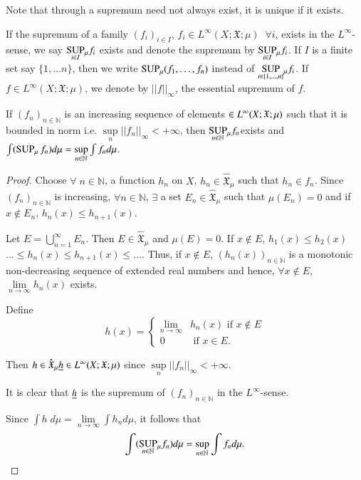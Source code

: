 Note that through a supremum need not always exist, it is unique if it
exists. 

If the supremum of a family $(f_i)_{i\in I}$, $f_i \in L^\infty (X;
\mathfrak{X}; \mu) \;\; \forall i$, exists in the $L^\infty$-sense, we say
$\underset{i \in I}{\operatorname{SUP}}{}_\mu f_i$ exists and denote the supremum by
$\underset{i\in I } {\operatorname{SUP}}{}_\mu f_i$. If $I$ is a finite set say
$\{1, \ldots n\}$, then we write $\operatorname{SUP}_\mu (f_1, \ldots ,f_n)$ instead
of $\underset{i\in \{1, \ldots, n\}}{\operatorname{SUP}}{}_\mu f_i$. If $f\in
L^\infty(X; \mathfrak{X}; \mu)$, we denote by $||f||_\infty$, the
essential supremum of $f$. 

\begin{proposition}\label{part1:chap3:prop26}
If $(f_n)_{n \in \mathbb{N}}$ is an increasing sequence of elements
$\in\break L^\infty(X; \mathfrak{X}; \mu)$ such that it is bounded in norm
i.e. $\sup\limits_n ||f_n||_\infty < + \infty$, then $\underset{n \in
  \mathbb{N}}{\operatorname{SUP}}{}_\mu f_n $\pageoriginale exists and $\int
(\operatorname{SUP}_\mu f_n) d\mu = \sup\limits_{n \in\mathbb{N}} \int f_n d \mu$. 
\end{proposition}


\begin{proof}
Choose $\forall \; n \in \mathbb{N}$, a function $h_n$ on $X$, $h_n
\in\hat{\mathfrak{X}}_\mu$ such that $h_n \in f_n$. Since $(f_n)_{n
  \in \mathbb{N}}$ is increasing, $\forall n \in \mathbb{N}$,
$\exists$ a set $E_n \in\hat{\mathfrak{X}}_\mu$ such that $\mu(E_n) =
0$ and if $x \not\in E_n$, $h_n(x) \leq h_{n+1} (x)$. 

Let $E = \bigcup\limits^\infty_{n =1} E_n$. Then $E \in
\hat{\mathfrak{X}}_\mu$ and $\mu(E) = 0$. If $x \not\in E$, $h_1 (x)
\leq h_2 (x)$ $\ldots \leq h_n (x) \leq h_{n+1} (x) \leq
\ldots$. Thus, if $x \not\in E$, $(h_n (x))_{n \in\mathbb{N}}$ is a
monotonic non-decreasing sequence of extended real numbers and hence,
$\forall x \not\in E$, $\lim\limits_{n \to \infty} h_n (x)$  exists. 

Define 
$$
h(x) = \begin{cases}
\lim\limits_{n \to \infty} &  h_n (x) \text{ if } x \not\in E\\
0 & \text{ if } x \in E. 
\end{cases}
$$

Then $h \in \hat{\mathfrak{X}}_\mu \underline{h} \in  L^\infty(X; \mathfrak{X};
\mu)$ since $\sup\limits_n ||f_n||_\infty < + \infty$. 

It is clear that $\underline{h}$ is the supremum of $(f_n)_{n \in\mathbb{N}}$
in the $L^\infty$-sense.

Since $\int h \; d \mu = \lim\limits_{n \to \infty} \int h_n d \mu$,
it follows that 
$$
\int (\underset{n \in \mathbb{N}}{\operatorname{SUP}}{}_\mu f_n) d \mu =
\sup\limits_{n \in \mathbb{N}} \int f_n d\mu. 
$$

\end{proof}


